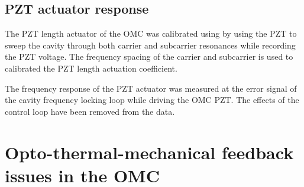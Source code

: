 

\subsection{PZT actuator response}
The PZT length actuator of the OMC was calibrated using by using the PZT to sweep the cavity through both carrier and subcarrier resonances while recording the PZT voltage. %
The frequency spacing of the carrier and subcarrier is used to calibrated the PZT length actuation coefficient.


The frequency response of the PZT actuator was measured at the error signal of the cavity frequency locking loop while driving the OMC PZT. %
The effects of the control loop have been removed from the data.


\section{Opto-thermal-mechanical feedback issues in the OMC}


